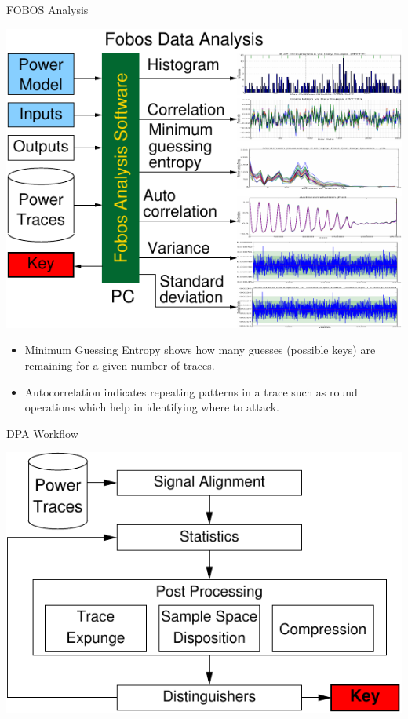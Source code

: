 \documentclass[xcolor=pdftex,dvipsnames,table,final]{beamer}
\begin{document}
\begin{frame}[fragile]{}
\begin{columns}[t]
\begin{column}{.31\linewidth}
       \begin{block}{FOBOS Analysis}
        \begin{minipage}{0.69\linewidth}
		\includegraphics[scale=1.5]{../figures/fobos-dan}
        \end{minipage}
	\hspace{-5ex}
	\begin{minipage}{0.31\linewidth}
          {\small
          \begin{itemize}
            \item Minimum Guessing Entropy shows how many guesses (possible keys) are 
                  remaining for a given number of traces. 
            \item Autocorrelation indicates repeating patterns in a trace such as round 
                  operations which help in identifying where to attack. 
          \end{itemize}
          }  
	\end{minipage} 
       \end{block}
       \begin{block}{DPA Workflow}
        \vspace{-1ex}
        \begin{center}
          \includegraphics[scale=1.5]{../figures/data_anl}

\end{center}
\end{block}
\end{column}
\end{columns}
\end{frame}
\end{document}

